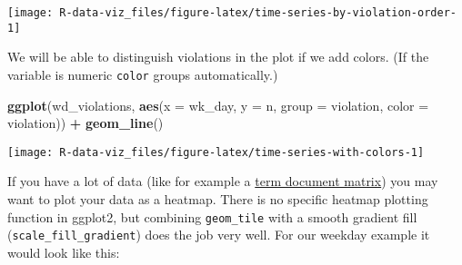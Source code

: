 \documentclass[]{book}
\newenvironment{Shaded}{\begin{snugshade}}{\end{snugshade}}
\newcommand{\KeywordTok}[1]{\textcolor[rgb]{0.13,0.29,0.53}{\textbf{#1}}}
\newcommand{\DataTypeTok}[1]{\textcolor[rgb]{0.13,0.29,0.53}{#1}}
\newcommand{\StringTok}[1]{\textcolor[rgb]{0.31,0.60,0.02}{#1}}
\newcommand{\OperatorTok}[1]{\textcolor[rgb]{0.81,0.36,0.00}{\textbf{#1}}}
\newcommand{\NormalTok}[1]{#1}
\theoremstyle{definition}
\theoremstyle{definition}
\theoremstyle{definition}
\theoremstyle{remark}
\begin{document}
\begin{Shaded}
\end{Shaded}

\texttt{[image: R-data-viz\_files/figure-latex/time-series-by-violation-order-1]}

We will be able to distinguish violations in the plot if we add colors.
(If the variable is numeric \texttt{color} groups automatically.)

\begin{Shaded}
\begin{Highlighting}[]
\KeywordTok{ggplot}\NormalTok{(wd_violations, }\KeywordTok{aes}\NormalTok{(}\DataTypeTok{x =}\NormalTok{ wk_day, }\DataTypeTok{y =}\NormalTok{ n, }\DataTypeTok{group =}\NormalTok{ violation, }\DataTypeTok{color =}\NormalTok{ violation)) }\OperatorTok{+}
\StringTok{  }\KeywordTok{geom_line}\NormalTok{()}
\end{Highlighting}
\end{Shaded}

\texttt{[image: R-data-viz\_files/figure-latex/time-series-with-colors-1]}

If you have a lot of data (like for example a
\href{https://en.wikipedia.org/wiki/Document-term_matrix}{term document
matrix}) you may want to plot your data as a heatmap. There is no
specific heatmap plotting function in ggplot2, but combining
\texttt{geom\_tile} with a smooth gradient fill
(\texttt{scale\_fill\_gradient}) does the job very well. For our weekday
example it would look like this:
\end{document}

